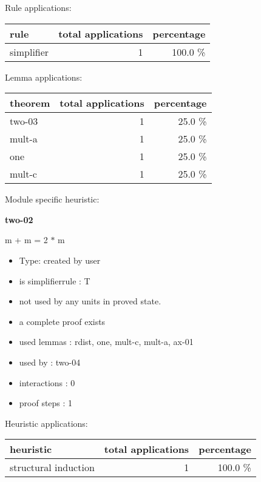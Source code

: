 \documentclass[a4paper]{article}
\begin{document}
Rule applications:

\begin{supertabular}{l|r|r}
rule	        & total applications & percentage \\ \hline
simplifier & 1 & 100.0 \% \\

\end{supertabular}

Lemma applications:

\begin{supertabular}{l|r|r}
theorem	        & total applications & percentage \\ \hline
two-03 & 1 & 25.0 \% \\
mult-a & 1 & 25.0 \% \\
one & 1 & 25.0 \% \\
mult-c & 1 & 25.0 \% \\

\end{supertabular}

Module specific heuristic:

\pagebreak

{\LARGE\bf two-02}\label{lemma-two-02}

\medskip

 \Fol m + m = 2 $*$ m

\begin{itemize}

\item Type: created by user

\item is simplifierrule : T
\item not used by any units in proved state.
\item       a complete proof exists
\item       used lemmas  : rdist, one, mult-c, mult-a, ax-01
\item       used by      : two-04
\item       interactions : 0
\item       proof steps  : 1
\end{itemize}

\medskip


Heuristic applications:

\begin{supertabular}{l|r|r}
heuristic	& total applications & percentage \\ \hline
structural induction & 1 & 100.0 \% \\

\end{supertabular}
\end{document}
